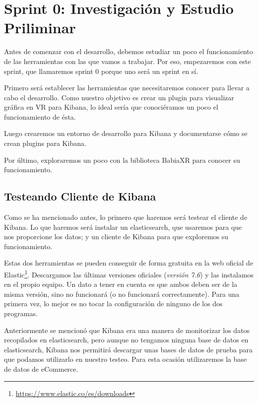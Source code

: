 \documentclass[a4paper, 12pt]{book}
\begin{document}

\section{Sprint 0: Investigación y Estudio Priliminar }
\label{sec:sprint0}

Antes de comenzar con el desarrollo, debemos estudiar un poco el funcionamiento de las herramientas con las que vamos a trabajar. Por eso, empezaremos con este sprint, que llamaremos sprint 0 porque uno será un sprint en sí. 

Primero será establecer las herramientas que necesitaremos conocer para llevar a cabo el desarrollo. Como nuestro objetivo es crear un plugin para visualizar gráfica en VR para Kibana, lo ideal sería que conociéramos un poco el funcionamiento de ésta. 

Luego crearemos un entorno de desarrollo para Kibana y documentarse cómo se crean plugins para Kibana.

Por último, exploraremos un poco con la biblioteca BabiaXR para conocer su funcionamiento.


\subsection{Testeando Cliente de Kibana}

Como se ha mencionado antes, lo primero que haremos será testear el cliente de Kibana. Lo que haremos será instalar un elasticsearch, que usaremos para que nos proporcione los datos; y un cliente de Kibana para que exploremos su funcionamiento.

Estas dos herramientas se pueden conseguir de forma gratuita en la web oficial de Elastic\footnote{\url{https://www.elastic.co/es/downloads}}. Descargamos las últimas versiones oficiales (\textit{versión 7.6}) y las instalamos en el propio equipo. Un dato a tener en cuenta es que ambos deben ser de la misma versión, sino no funcionará (o no funcionará correctamente). Para una primera vez, lo mejor es no tocar la configuración de ninguno de los dos programas.

Anteriormente se mencionó que Kibana era una manera de monitorizar los datos recopilados en elasticsearch, pero aunque no tengamos ninguna base de datos en elasticsearch, Kibana nos permitirá descargar unas bases de datos de prueba para que podamos utilizarlo en nuestro testeo. Para esta ocasión utilizaremos la base de datos de eCommerce.
\end{document}
